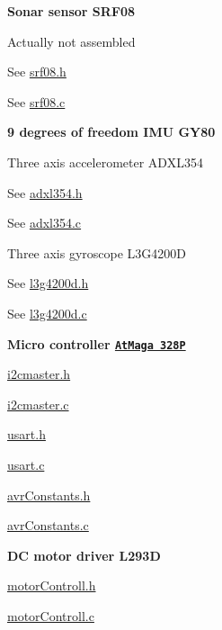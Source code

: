 \begin{DoxyItemize}
\item  {\bfseries \-Sonar sensor \-S\-R\-F08\par
} \-Actually not assembled\par
\par
 \-See \hyperlink{srf08_8h}{srf08.\-h}\par
 \-See \hyperlink{srf08_8c}{srf08.\-c}\par
       
\item  {\bfseries 9 degrees of freedom \-I\-M\-U \-G\-Y80\par
\par
} \-Three axis accelerometer \-A\-D\-X\-L354\par
 \-See \hyperlink{adxl354_8h}{adxl354.\-h}\par
 \-See \hyperlink{adxl354_8c}{adxl354.\-c}\par
\par
 \-Three axis gyroscope \-L3\-G4200\-D\par
 \-See \hyperlink{l3g4200d_8h}{l3g4200d.\-h}\par
 \-See \hyperlink{l3g4200d_8c}{l3g4200d.\-c}\par
\par
       
\item  {\bfseries \-Micro controller \href{http://www.atmel.com/devices/atmega328p.aspx}{\tt \-At\-Maga 328\-P}}\par
\par
 \hyperlink{i2cmaster_8h}{i2cmaster.\-h}\par
 \hyperlink{i2cmaster_8c}{i2cmaster.\-c}\par
 \hyperlink{usart_8h}{usart.\-h}\par
 \hyperlink{usart_8c}{usart.\-c}\par
 \hyperlink{avr_constants_8h}{avr\-Constants.\-h}\par
 \hyperlink{avr_constants_8c}{avr\-Constants.\-c}\par
\par
       
\item  {\bfseries \-D\-C motor driver \-L293\-D}\par
\par
 \hyperlink{motor_controll_8h}{motor\-Controll.\-h}\par
 \hyperlink{motor_controll_8c}{motor\-Controll.\-c}\par
\par
       
\end{DoxyItemize}

